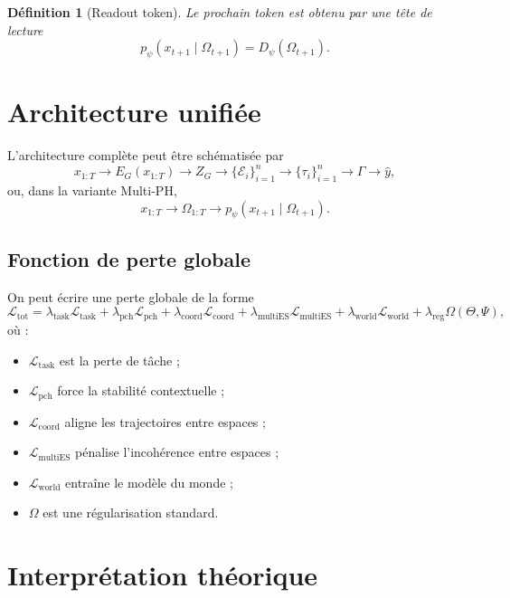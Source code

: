 \documentclass[11pt,a4paper]{article}
\newtheorem{definition}{Définition}[section]
\newcommand{\E}{\mathcal E}
\newcommand{\1}{\mathbf 1}
\begin{document}
\begin{definition}[Readout token]
Le prochain token est obtenu par une tête de lecture
\[
p_\psi(x_{t+1}\mid \Omega_{t+1})
=
D_\psi(\Omega_{t+1}).
\]
\end{definition}

\section{Architecture unifiée}

L'architecture complète peut être schématisée par
\[
x_{1:T}
\longrightarrow
E_G(x_{1:T})
\longrightarrow
Z_G
\longrightarrow
\{\E_i\}_{i=1}^n
\longrightarrow
\{\tau_i\}_{i=1}^n
\longrightarrow
\Gamma
\longrightarrow
\hat y,
\]
ou, dans la variante Multi-PH,
\[
x_{1:T}
\longrightarrow
\Omega_{1:T}
\longrightarrow
p_\psi(x_{t+1}\mid \Omega_{t+1}).
\]

\subsection{Fonction de perte globale}

On peut écrire une perte globale de la forme
\[
\mathcal L_{\mathrm{tot}}
=
\lambda_{\mathrm{task}}\mathcal L_{\mathrm{task}}
+
\lambda_{\mathrm{pch}}\mathcal L_{\mathrm{pch}}
+
\lambda_{\mathrm{coord}}\mathcal L_{\mathrm{coord}}
+
\lambda_{\mathrm{multiES}}\mathcal L_{\mathrm{multiES}}
+
\lambda_{\mathrm{world}}\mathcal L_{\mathrm{world}}
+
\lambda_{\mathrm{reg}}\Omega(\Theta,\Psi),
\]
où :
\begin{itemize}[leftmargin=2em]
    \item \(\mathcal L_{\mathrm{task}}\) est la perte de tâche ;
    \item \(\mathcal L_{\mathrm{pch}}\) force la stabilité contextuelle ;
    \item \(\mathcal L_{\mathrm{coord}}\) aligne les trajectoires entre espaces ;
    \item \(\mathcal L_{\mathrm{multiES}}\) pénalise l'incohérence entre espaces ;
    \item \(\mathcal L_{\mathrm{world}}\) entraîne le modèle du monde ;
    \item \(\Omega\) est une régularisation standard.
\end{itemize}

\section{Interprétation théorique}
\end{document}

